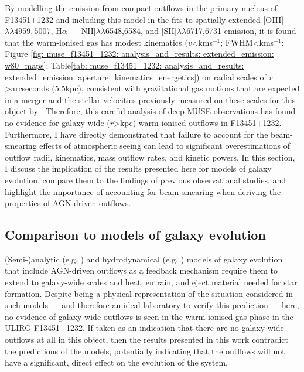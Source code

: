 By modelling the emission from compact outflows in the primary nucleus of F13451+1232 and including this model in the fits to spatially-extended [OIII]$\lambda\lambda4959,5007$, H$\alpha$ + {[}NII{]}$\lambda\lambda$6548,6584, and {[}SII{]}$\lambda\lambda$6717,6731 emission, it is found that the warm-ionised gas has modest kinematics ($v$\;\textless{}\;km\;s$^{-1}$; FWHM\;\textless{}\;km\;s$^{-1}$: Figure \ref{fig: muse_f13451_1232: analysis_and_results: extended_emission: w80_maps}; Table\;\ref{tab: muse_f13451_1232: analysis_and_results: extended_emission: aperture_kinematics_energetics}) on radial scales of $r$\;\textgreater{}\;arcseconds (5.5\;kpc), consistent with gravitational gas motions that are expected in a merger and the stellar velocities previously measured on these scales for this object by \citet{Perna2021}. Therefore, this careful analysis of deep MUSE observations has found no evidence for galaxy-wide ($r$\;\textgreater{}\;kpc) warm-ionised outflows in F13451+1232. Furthermore, I have directly demonstrated that failure to account for the beam-smearing effects of atmospheric seeing can lead to significant overestimations of outflow radii, kinematics, mass outflow rates, and kinetic powers. In this section, I discuss the implication of the results presented here for models of galaxy evolution, compare them to the findings of previous observational studies, and highlight the importance of accounting for beam smearing when deriving the properties of AGN-driven outflows.

\subsection{Comparison to models of galaxy evolution}
\label{section: muse_f13451_1232: discussion: comparison_to_models}

(Semi-)analytic (e.g. \citealt{Silk1998, Fabian1999, King2003, Zubovas2014}) and hydrodynamical (e.g. \citealt{DiMatteo2005, Curtis2016, Barai2018, Costa2018, Costa2022, Zubovas2023}) models of galaxy evolution that include AGN-driven outflows as a feedback mechanism require them to extend to galaxy-wide scales and heat, entrain, and eject material needed for star formation. Despite being a physical representation of the situation considered in such models --- and therefore an ideal laboratory to verify this prediction --- here, no evidence of galaxy-wide outflows is seen in the warm ionised gas phase in the ULIRG F13451+1232. If taken as an indication that there are no galaxy-wide outflows at all in this object, then the results presented in this work contradict the predictions of the models, potentially indicating that the outflows will not have a significant, direct effect on the evolution of the system.


